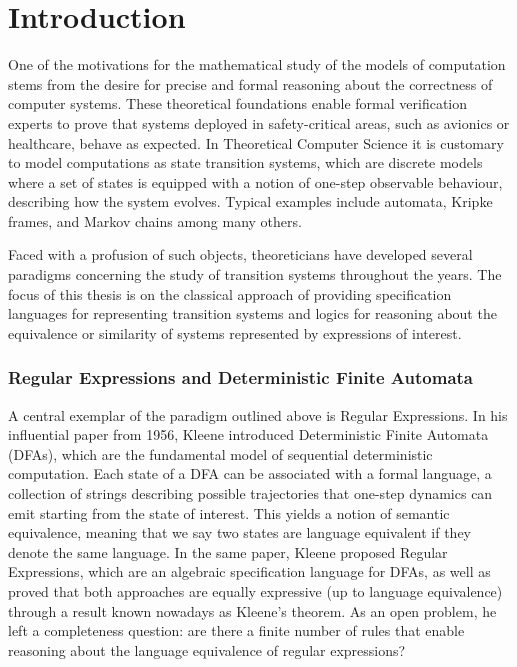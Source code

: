 \chapter{Introduction}
\label{chapter:introduction}

One of the motivations for the mathematical study of the models of computation stems from the desire for precise and formal reasoning about the correctness of computer systems. These theoretical foundations enable formal verification experts to prove that systems deployed in safety-critical areas, such as avionics or healthcare, behave as expected. In Theoretical Computer Science it is customary to model computations as state transition systems, which are discrete models where a set of states is equipped with a notion of one-step observable behaviour, describing how the system evolves. Typical examples include automata, Kripke frames, and Markov chains among many others. 

Faced with a profusion of such objects, theoreticians have developed several paradigms concerning the study of transition systems throughout the years. The focus of this thesis is on the classical approach of providing specification languages for representing transition systems and logics for reasoning about the equivalence or similarity of systems represented by expressions of interest. 
\subsection{Regular Expressions and Deterministic Finite Automata}
A central exemplar of the paradigm outlined above is Regular Expressions. In his influential paper from 1956, Kleene introduced Deterministic Finite Automata (DFAs), which are the fundamental model of sequential deterministic computation. Each state of a DFA can be associated with a formal language, a collection of strings describing possible trajectories that one-step dynamics can emit starting from the state of interest. This yields a notion of semantic equivalence, meaning that we say two states are language equivalent if they denote the same language. In the same paper, Kleene proposed Regular Expressions, which are an algebraic specification language for DFAs, as well as proved that both approaches are equally expressive (up to language equivalence) through a result known nowadays as Kleene’s theorem. As an open problem, he left a completeness question: are there a finite number of rules that enable reasoning about the language equivalence of regular expressions? 


